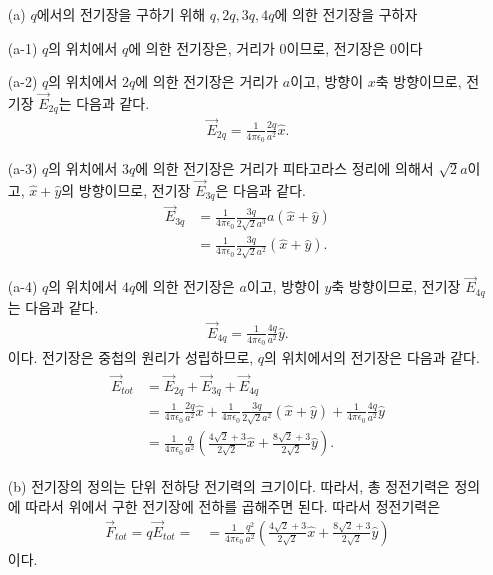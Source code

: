 \documentclass[tightenlines,floatfix,nofootinbib,superscriptaddress,fleqn]{revtex4-2}
\begin{document}
\begin{itemize}
  \item[(a)] 
  $q$에서의 전기장을 구하기 위해 $q,2q,3q,4q$에 의한 전기장을 구하자
  \item[(a-1)]
  $q$의 위치에서 $q$에 의한 전기장은, 거리가 $0$이므로, 전기장은 0이다
  \item[(a-2)]
  $q$의 위치에서 $2q$에 의한 전기장은 거리가 $a$이고, 방향이 $x$축 방향이므로,
  전기장 $\vec{E}_{2q}$는 다음과 같다.
  \begin{align}
    \vec{E}_{2q}=\frac{1}{4\pi\epsilon_0}\frac{2q}{a^2}\hat{x}.
  \end{align}
  \item[(a-3)]
  $q$의 위치에서 $3q$에 의한 전기장은 거리가 피타고라스 정리에 의해서
  $\sqrt{2}a$이고, $\hat{x}+\hat{y}$의 방향이므로, 전기장 $\vec{E}_{3q}$은 다음과 같다.
  \begin{align}
    \vec{E}_{3q}&=\frac{1}{4\pi\epsilon_0}\frac{3q}{2\sqrt{2}a^3}a\left(\hat{x}+\hat{y}\right)\\
    &=\frac{1}{4\pi\epsilon_0}\frac{3q}{2\sqrt{2}a^2}\left(\hat{x}+\hat{y}\right).
  \end{align}
  \item[(a-4)]
  $q$의 위치에서 $4q$에 의한 전기장은 $a$이고, 방향이 $y$축 방향이므로,
  전기장 $\vec{E}_{4q}$는 다음과 같다.
  \begin{align}
    \vec{E}_{4q}=\frac{1}{4\pi\epsilon_0}\frac{4q}{a^2}\hat{y}.
  \end{align}
  이다. 전기장은 중첩의 원리가 성립하므로, $q$의 위치에서의 전기장은
  다음과 같다.
  \begin{align}
    \begin{split}
      \vec{E}_{tot}&=\vec{E}_{2q}+\vec{E}_{3q}+\vec{E}_{4q}\\
      &=\frac{1}{4\pi\epsilon_0}\frac{2q}{a^2}\hat{x}+\frac{1}{4\pi\epsilon_0}\frac{3q}{2\sqrt{2}a^2}\left(\hat{x}+\hat{y}\right)+\frac{1}{4\pi\epsilon_0}\frac{4q}{a^2}\hat{y}\\
      &=\frac{1}{4\pi\epsilon_0}\frac{q}{a^2}\left(\frac{4\sqrt{2}+3}{2\sqrt{2}}\hat{x}+\frac{8\sqrt{2}+3}{2\sqrt{2}}\hat{y}\right).
    \end{split}
  \end{align}
  \item[(b)]
  전기장의 정의는 단위 전하당 전기력의 크기이다. 따라서, 총 정전기력은
  정의에 따라서 위에서 구한 전기장에 전하를 곱해주면 된다. 따라서 정전기력은
  \begin{align}
    \vec{F}_{tot}=q\vec{E}_{tot}=&=\frac{1}{4\pi\epsilon_0}\frac{q^2}{a^2}\left(\frac{4\sqrt{2}+3}{2\sqrt{2}}\hat{x}+\frac{8\sqrt{2}+3}{2\sqrt{2}}\hat{y}\right)
  \end{align}
  이다.
  \end{itemize}
\vspace{1.cm}
\end{document}
